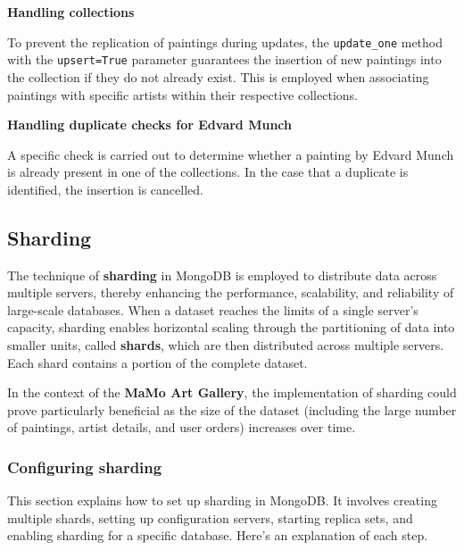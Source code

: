 \documentclass[a4paper,12pt]{article}
\begin{document}
\textbf{Handling collections}

To prevent the replication of paintings during updates, the \texttt{update\_one} method with the \texttt{upsert=True} parameter guarantees the insertion of new paintings into the collection if they do not already exist. This is employed when associating paintings with specific artists within their respective collections.

\textbf{Handling duplicate checks for Edvard Munch}

A specific check is carried out to determine whether a painting by Edvard Munch is already present in one of the collections. In the case that a duplicate is identified, the insertion is cancelled.


\subsection{Sharding}
\justify

The technique of \textbf{sharding} in MongoDB is employed to distribute data across multiple servers, thereby enhancing the performance, scalability, and reliability of large-scale databases. When a dataset reaches the limits of a single server's capacity, sharding enables horizontal scaling through the partitioning of data into smaller units, called \textbf{shards}, which are then distributed across multiple servers. Each shard contains a portion of the complete dataset.

In the context of the \textbf{MaMo Art Gallery}, the implementation of sharding could prove particularly beneficial as the size of the dataset (including the large number of paintings, artist details, and user orders) increases over time.

\subsubsection{Configuring sharding}
This section explains how to set up sharding in MongoDB. It involves creating multiple shards, setting up configuration servers, starting replica sets, and enabling sharding for a specific database. Here’s an explanation of each step.
\end{document}
